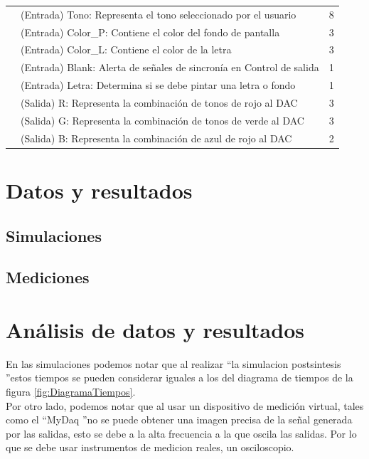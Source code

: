\documentclass[12pt,a4paper]{article}
\begin{document}
\begin{table}[]
\begin{tabular}{|l|l|l|}
		& (Entrada) Tono: Representa el tono seleccionado por el usuario       & 8              \\ \cline{2-3} 
		& (Entrada) Color\_P: Contiene el color del fondo de pantalla          & 3              \\ \cline{2-3} 
		& (Entrada) Color\_L: Contiene el color de la letra                    & 3              \\ \cline{2-3} 
		& (Entrada) Blank: Alerta de señales de sincronía en Control de salida & 1              \\ \cline{2-3} 
		& (Entrada) Letra: Determina si se debe pintar una letra o fondo       & 1              \\ \cline{2-3} 
		& (Salida) R: Representa la combinación de tonos de rojo al DAC        & 3              \\ \cline{2-3} 
		& (Salida) G: Representa la combinación de tonos de verde al DAC       & 3              \\ \cline{2-3} 
		& (Salida) B: Representa la combinación de azul de rojo al DAC         & 2              \\ \hline
	\end{tabular}
\end{table}

\section{Datos y resultados}
\subsection{Simulaciones}


\subsection{Mediciones}


\section{Análisis de datos y resultados}
En las simulaciones podemos notar que al realizar \textquotedblleft la simulacion postsintesis \textquotedblright estos tiempos se pueden considerar iguales a los del diagrama de tiempos de la figura \ref{fig:DiagramaTiempos}.\\[2ex]
Por otro lado, podemos notar que al usar un dispositivo de medición virtual, tales como el \textquotedblleft MyDaq \textquotedblright no se puede obtener una imagen precisa de la señal generada por las salidas, esto se debe a la alta frecuencia a la que oscila las salidas. Por lo que se debe usar instrumentos de medicion reales, un osciloscopio.\\[2ex]
\end{document}
